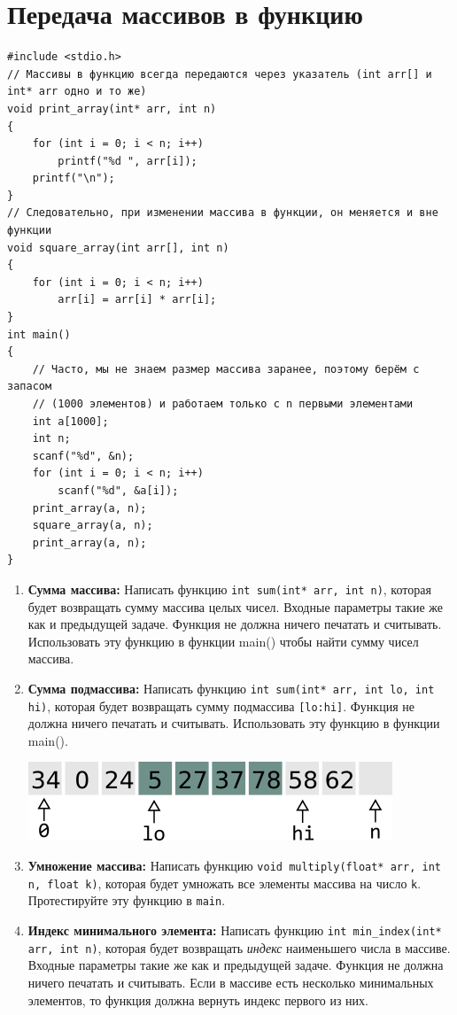 \documentclass{article}
\begin{document}
\section*{Передача массивов в функцию}
\begin{lstlisting}
#include <stdio.h>
// Массивы в функцию всегда передаются через указатель (int arr[] и int* arr одно и то же)
void print_array(int* arr, int n) 
{
	for (int i = 0; i < n; i++)
		printf("%d ", arr[i]);
	printf("\n");
}
// Следовательно, при изменении массива в функции, он меняется и вне функции
void square_array(int arr[], int n) 
{
	for (int i = 0; i < n; i++)
		arr[i] = arr[i] * arr[i];
}
int main() 
{
	// Часто, мы не знаем размер массива заранее, поэтому берём с запасом 
	// (1000 элементов) и работаем только с n первыми элементами
	int a[1000];
	int n;
	scanf("%d", &n);
	for (int i = 0; i < n; i++)
		scanf("%d", &a[i]);
	print_array(a, n);
	square_array(a, n);
	print_array(a, n);
}
\end{lstlisting}
\begin{enumerate}
\item \textbf{Сумма массива:} Написать функцию \texttt{int sum(int* arr, int n)}, которая будет возвращать сумму массива целых чисел. Входные параметры такие же как и предыдущей задаче. Функция не должна ничего печатать и считывать. Использовать эту функцию в функции main() чтобы найти сумму чисел массива.

\item \textbf{Сумма подмассива:} Написать функцию \texttt{int sum(int* arr, int lo, int hi)}, которая будет возвращать сумму подмассива \texttt{[lo:hi]}. Функция не должна ничего печатать и считывать. Использовать эту функцию в функции main().
\begin{center}
\includegraphics[scale=0.86]{../images/subarray.png}
\end{center}
\item \textbf{Умножение массива:} Написать функцию \texttt{void multiply(float* arr, int n, float k)}, которая будет умножать все элементы массива на число \texttt{k}. Протестируйте эту функцию в \texttt{main}.

\item \textbf{Индекс минимального элемента:} Написать функцию \texttt{int min\_index(int* arr, int n)}, которая будет возвращать \textit{индекс} наименьшего числа в массиве. Входные параметры такие же как и предыдущей задаче. Функция не должна ничего печатать и считывать. Если в массиве есть несколько минимальных элементов, то функция должна вернуть индекс первого из них.
\end{enumerate}
\end{document}
